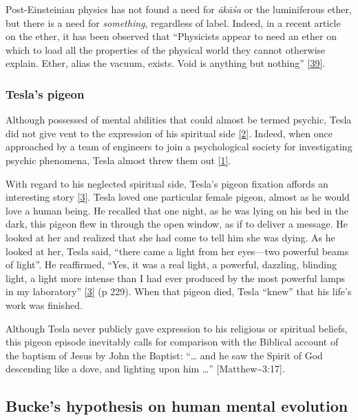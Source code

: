 \documentclass[
  a4paper,
]{article}
\begin{document}
Post-Einsteinian physics has not found a need for \emph{ākāśa} or the
luminiferous ether, but there is a need for \emph{something}, regardless
of label. Indeed, in a recent article on the ether, it has been observed
that ``Physicists appear to need an ether on which to load all the
properties of the physical world they cannot otherwise explain. Ether,
alias the vacuum, exists. Void is anything but nothing''
\protect\hyperlink{ref-heil03}{{[}39{]}}.

\hypertarget{teslas-pigeon}{%
\subsubsection{Tesla's pigeon}\label{teslas-pigeon}}

Although possessed of mental abilities that could almost be termed
psychic, Tesla did not give vent to the expression of his spiritual side
\protect\hyperlink{ref-oneill80}{{[}2{]}}. Indeed, when once approached
by a team of engineers to join a psychological society for investigating
psychic phenomena, Tesla almost threw them out
\protect\hyperlink{ref-john83}{{[}1{]}}.

With regard to his neglected spiritual side, Tesla's pigeon fixation
affords an interesting story \protect\hyperlink{ref-cheney81}{{[}3{]}}.
Tesla loved one particular female pigeon, almost as he would love a
human being. He recalled that one night, as he was lying on his bed in
the dark, this pigeon flew in through the open window, as if to deliver
a message. He looked at her and realized that she had come to tell him
she was dying. As he looked at her, Tesla said, ``there came a light
from her eyes---two powerful beams of light''. He reaffirmed, ``Yes, it
was a real light, a powerful, dazzling, blinding light, a light more
intense than I had ever produced by the most powerful lamps in my
laboratory'' \protect\hyperlink{ref-cheney81}{{[}3{]}} (p 229). When
that pigeon died, Tesla ``knew'' that his life's work was finished.

Although Tesla never publicly gave expression to his religious or
spiritual beliefs, this pigeon episode inevitably calls for comparison
with the Biblical account of the baptism of Jesus by John the Baptist:
``\ldots{} and he saw the Spirit of God descending like a dove, and
lighting upon him \ldots{}'' {[}Matthew\textasciitilde3:17{]}.

\hypertarget{buckes-hypothesis-on-human-mental-evolution}{%
\subsection{Bucke's hypothesis on human mental
evolution}\label{buckes-hypothesis-on-human-mental-evolution}}
\end{document}
